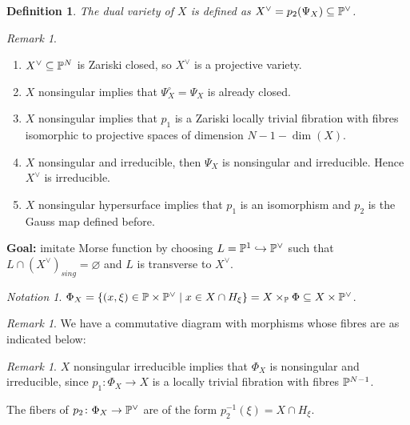 \documentclass[A4paper, british, reqno]{amsart}
\theoremstyle{darkgreentheorem}
\theoremstyle{darkbluedefinition}
\newtheorem{defn}[thm]{Definition}
\theoremstyle{darkredexample}
\theoremstyle{remark}
\newtheorem{rem}[thm]{Remark}
\newtheorem{nota}[thm]{Notation}
\newcommand{\1}{\mathbbm{1}}
\newcommand{\dual}{^{\vee}}
\newcommand{\tms}{\times}
\newcommand{\sub}{\subseteq}
\newcommand{\mono}{\hookrightarrow}
\begin{document}
\begin{defn}
    The \textit{dual variety} of $X$ is defined as $X\dual=p_{2}(\Psi_{X})\sub \P\dual$.
\end{defn}

\begin{rem}
    \begin{enumerate}
	\item $X\dual \sub \P^{N}$ is Zariski closed, so $X\dual$ is a projective variety.
	\item $X$ nonsingular implies that $\Psi_{X}^{\circ}=\Psi_{X}$ is already closed.
	\item $X$ nonsingular implies that $p_{1}$ is a Zariski locally trivial fibration with fibres isomorphic to projective spaces of dimension $N-1-\dim(X)$.
	\item $X$ nonsingular and irreducible, then $\Psi_{X}$ is nonsingular and irreducible.
	    Hence $X\dual$ is irreducible.
	\item $X$ nonsingular hypersurface implies that $p_{1}$ is an isomorphism and $p_{2}$ is the Gauss map defined before.
    \end{enumerate}
\end{rem}

\textbf{Goal:} imitate Morse function by choosing $L=\P^{1}\mono \P\dual$ such that $L\cap (X\dual)_{sing}=\varnothing$ and $L$ is transverse to $X\dual$.

\begin{nota}
    $\Phi_{X}=\{(x,\xi)\in \P\tms \P\dual \mid x\in X\cap H_{\xi} \}= X\times_{\P}\Phi\sub X\tms \P\dual$.
\end{nota}

\begin{rem}
    We have a commutative diagram with morphisms whose fibres are as indicated below:
    \begin{center}
    \end{center}
\end{rem}

\begin{rem}
    $X$ nonsingular irreducible implies that $\Phi_{X}$ is nonsingular and irreducible, since $p_{1}\colon \Phi_{X}\to X$ is a locally trivial fibration with fibres $\P^{N-1}$.

    The fibers of $p_{2}\colon \Phi_{X}\to \P\dual$ are of the form $p_{2}^{-1}(\xi)=X\cap H_{\xi}$.
\end{rem}
\end{document}

